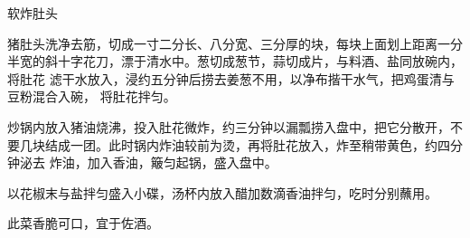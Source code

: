 \begin{recipe}{软炸肚头}

\ingredients


\preparation

\step 猪肚头洗净去筋，切成一寸二分长、八分宽、三分厚的块，每块上面划上距离一分
半宽的斜十字花刀，漂于清水中。葱切成葱节，蒜切成片，与料酒、盐同放碗内，将肚花
滤干水放入，浸约五分钟后捞去姜葱不用，以净布揩干水气，把鸡蛋清与豆粉混合入碗，
将肚花拌匀。

\step 炒锅内放入猪油烧沸，投入肚花微炸，约三分钟以漏瓢捞入盘中，把它分散开，不
要几块结成一团。此时锅内炸油较前为烫，再将肚花放入，炸至稍带黄色，约四分钟泌去
炸油，加入香油，簸匀起锅，盛入盘中。

\step 以花椒末与盐拌匀盛入小碟，汤杯内放入醋加数滴香油拌匀，吃时分别蘸用。

\features

此菜香脆可口，宜于佐酒。

\end{recipe}

